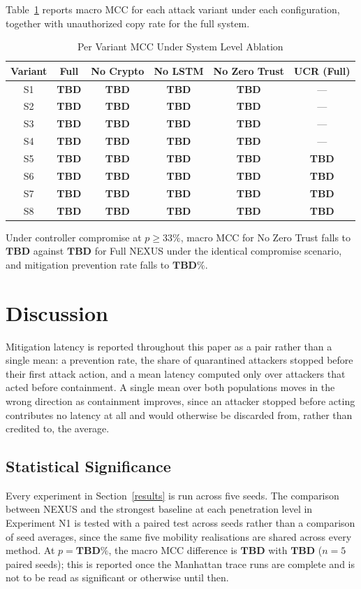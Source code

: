 \documentclass[lettersize,journal]{IEEEtran}
\theoremstyle{plain}
\theoremstyle{remark}
\newcommand{\TBD}{\textbf{TBD}} %
\begin{document}
	Table~\ref{tab:n3_variant} reports macro MCC for each attack variant
	under each configuration, together with unauthorized copy rate for the
	full system.
	\begin{table}[!t]
		\centering
		\caption{Per Variant MCC Under System Level Ablation}
		\label{tab:n3_variant}
		\renewcommand{\arraystretch}{1.15}
		\footnotesize
		\begin{tabular}{|c|c|c|c|c|c|}
			\hline
			\textbf{Variant} & \textbf{Full} & \textbf{No Crypto} & \textbf{No LSTM} & \textbf{No Zero Trust} & \textbf{UCR (Full)} \\
			\hline
			S1 & \TBD & \TBD & \TBD & \TBD & --- \\
			\hline
			S2 & \TBD & \TBD & \TBD & \TBD & --- \\
			\hline
			S3 & \TBD & \TBD & \TBD & \TBD & --- \\
			\hline
			S4 & \TBD & \TBD & \TBD & \TBD & --- \\
			\hline
			S5 & \TBD & \TBD & \TBD & \TBD & \TBD \\
			\hline
			S6 & \TBD & \TBD & \TBD & \TBD & \TBD \\
			\hline
			S7 & \TBD & \TBD & \TBD & \TBD & \TBD \\
			\hline
			S8 & \TBD & \TBD & \TBD & \TBD & \TBD \\
			\hline
		\end{tabular}
	\end{table}
	Under controller compromise at $p \geq 33\%$, macro MCC for
	No Zero Trust falls to $\TBD$ against $\TBD$ for Full NEXUS under the
	identical compromise scenario, and mitigation prevention rate falls to
	$\TBD\%$.
	
	
	
	\section{Discussion}\label{discussion}
	
	Mitigation latency is reported throughout this paper as a pair rather
	than a single mean: a prevention rate, the share of quarantined
	attackers stopped before their first attack action, and a mean latency
	computed only over attackers that acted before containment. A single
	mean over both populations moves in the wrong direction as containment
	improves, since an attacker stopped before acting contributes no
	latency at all and would otherwise be discarded from, rather than
	credited to, the average.
	
	\subsection{Statistical Significance}
	Every experiment in Section~\ref{results} is run across five seeds.
	The comparison between NEXUS and the strongest baseline at each
	penetration level in Experiment N1 is tested with a paired test across
	seeds rather than a comparison of seed averages, since the same five
	mobility realisations are shared across every method. At
	$p{=}\TBD\%$, the macro MCC difference is $\TBD$ with $\TBD$
	($n{=}5$ paired seeds); this is reported once the Manhattan trace runs
	are complete and is not to be read as significant or otherwise until
	then.
	
\end{document}
